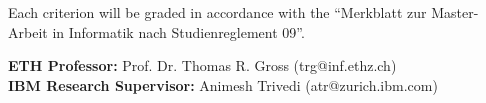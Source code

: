 \documentclass[10pt,a4paper]{article}
\begin{document}
Each criterion will be graded in accordance with the
``Merkblatt zur Master-Arbeit in Informatik nach Studienreglement 09''.


\textbf{ETH Professor:} Prof. Dr. Thomas R. Gross (trg@inf.ethz.ch)\\
\textbf{IBM Research Supervisor:} Animesh Trivedi (atr@zurich.ibm.com)\\

\raggedright


\end{document}
